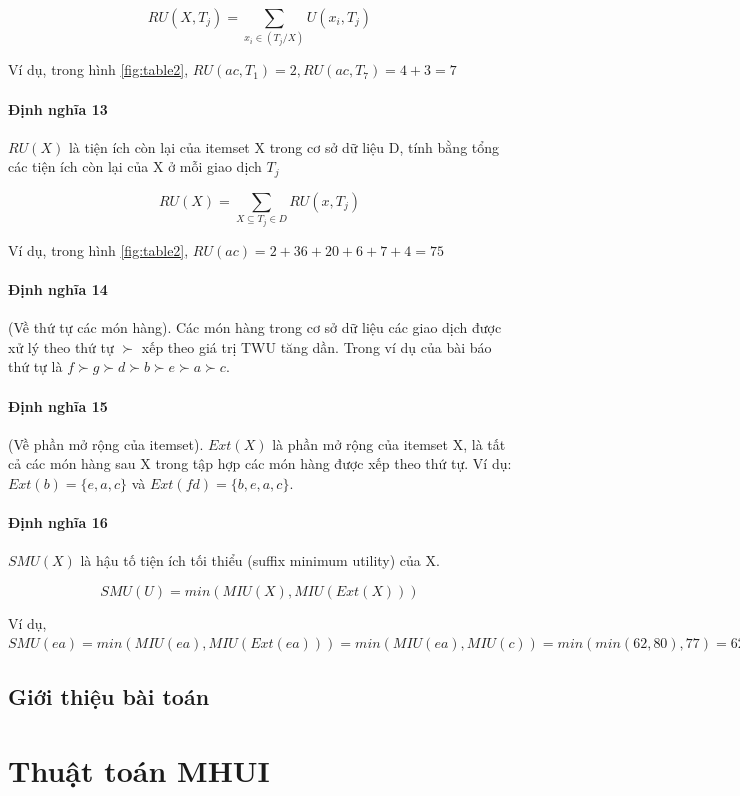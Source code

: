 $$ RU(X, T_j) = \sum_{x_i \in (T_j/X)} U(x_i, T_j) $$

Ví dụ, trong hình \ref{fig:table2}, $RU(ac, T_1) = 2, RU(ac, T_7) = 4 + 3 = 7 $  

\paragraph{Định nghĩa 13} $RU(X)$ là tiện ích còn lại của itemset X trong cơ sở dữ liệu D, tính bằng tổng các tiện ích còn lại của X ở mỗi giao dịch $T_j$

$$ RU(X) = \sum_{X \subseteq T_j \in D} RU(x, T_j) $$

Ví dụ, trong hình \ref{fig:table2}, $RU(ac) = 2 + 36 + 20 + 6 + 7 + 4 = 75$

\paragraph{Định nghĩa 14} (Về thứ tự các món hàng). Các món hàng trong cơ sở dữ liệu các giao dịch được xử lý theo thứ tự $\succ$ xếp theo giá trị TWU tăng dần. Trong ví dụ của bài báo thứ tự là $ f \succ g \succ d \succ b \succ e \succ a \succ c $.

\paragraph{Định nghĩa 15} (Về phần mở rộng của itemset). $Ext(X)$ là phần mở rộng của itemset X, là tất cả các món hàng sau X trong tập hợp các món hàng được xếp theo thứ tự. Ví dụ: $Ext(b) = \{ e, a, c \}$ và $Ext(fd) = \{b, e, a, c \}$.

\paragraph{Định nghĩa 16} $SMU(X)$ là hậu tố tiện ích tối thiểu (suffix minimum utility) của X. 

$$ SMU(U) = min(MIU(X), MIU(Ext(X))) $$

Ví dụ, $SMU(ea) = min(MIU(ea), MIU(Ext(ea))) = min (MIU(ea), MIU(c)) = min(min(62, 80), 77) = 62$



\subsection{Giới thiệu bài toán}

\section{Thuật toán MHUI}




